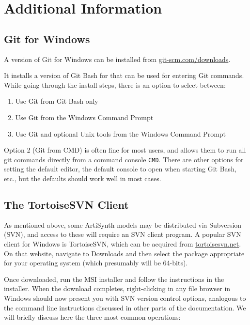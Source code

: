 \section{Additional Information}

\ifWindows

\subsection{Git for Windows}
\label{GitForWindows}

A version of Git for Windows can be installed from
\href{https://git-scm.com/downloads}{git-scm.com/downloads}.

It installs a version of Git Bash for that can be used for entering
Git commands.  While going through the install steps, there is an
option to select between:

\begin{enumerate}

\item Use Git from Git Bash only
\item Use Git from the Windows Command Prompt
\item Use Git and optional Unix tools from the Windows Command Prompt

\end{enumerate}

Option 2 (Git from CMD) is often fine for most users, and allows them
to run all git commands directly from a command console {\tt CMD}.  There are
other options for setting the default editor, the default
console to open when starting Git Bash, etc., but the defaults should
work well in most cases.

\subsection{The TortoiseSVN Client}
\label{TortoiseSVN}

As mentioned above, some ArtiSynth models may be distributed via
Subversion (SVN), and access to these will require an SVN client
program. A popular SVN client for Windows is TortoiseSVN, which can be
acquired from
\href{http://tortoisesvn.net}{tortoisesvn.net}. On that website,
navigate to {\sf Downloads} and then select the package appropriate
for your operating system (which presumably will be 64-bits).

Once downloaded, run the MSI installer and follow the instructions in
the installer. When the download completes, right-clicking in any file
browser in Windows should now present you with SVN version control
options, analogous to the command line instructions discussed in other
parts of the documentation. We will briefly discuss here the three
most common operations:

